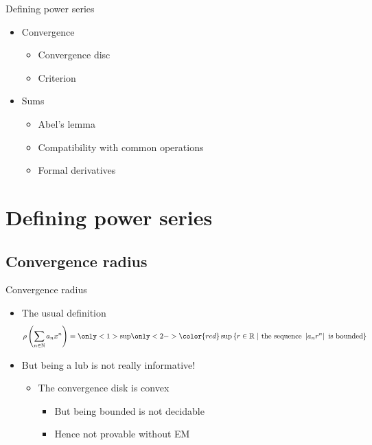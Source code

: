 \documentclass{beamer}
\begin{document}
\begin{frame}{Defining power series}
\begin{itemize}
\item Convergence
  \begin{itemize}
    \item Convergence disc
    \item Criterion
  \end{itemize}
\item Sums
  \begin{itemize}
    \item Abel's lemma
    \item Compatibility with common operations
    \item Formal derivatives
  \end{itemize}
\end{itemize}
\end{frame}

\section{Defining power series}

\subsection{Convergence radius}

\begin{frame}{Convergence radius}
\begin{itemize}
  \item The usual definition
    $$\rho\left(\sum_{n \in \N} a_n x^n\right) = \only<1>{\sup}
    \only<2->{{\color{red} \sup }} \left\lbrace
     r \in \R ~|~\text{the sequence } \left|a_n r^n\right|
     \text{ is bounded}\right\rbrace$$
  \item<2-> But being a lub is not really informative!
  \begin{itemize}
    \item<3-> The convergence disk is convex
    \begin{itemize}
      \item<4-> But being bounded is not decidable
      \item<5-> Hence not provable without EM
    \end{itemize}
  \end{itemize}
\end{itemize}
\end{frame}
\end{document}

